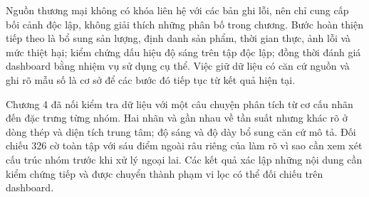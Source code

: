 Nguồn thương mại không có khóa liên hệ với các bản ghi lỗi, nên chỉ cung cấp bối cảnh độc lập, không giải thích những phân bố trong chương. Bước hoàn thiện tiếp theo là bổ sung sản lượng, định danh sản phẩm, thời gian thực, ảnh lỗi và mức thiệt hại; kiểm chứng dấu hiệu độ sáng trên tập độc lập; đồng thời đánh giá dashboard bằng nhiệm vụ sử dụng cụ thể. Việc giữ dữ liệu có căn cứ nguồn và ghi rõ mẫu số là cơ sở để các bước đó tiếp tục từ kết quả hiện tại.

Chương 4 đã nối kiểm tra dữ liệu với một câu chuyện phân tích từ cơ cấu nhãn đến đặc trưng từng nhóm. Hai nhãn  và  gần nhau về tần suất nhưng khác rõ ở dòng thép và diện tích trung tâm; độ sáng và độ dày bổ sung căn cứ mô tả. Đối chiếu 326 cờ toàn tập với sáu điểm ngoài râu riêng của  làm rõ vì sao cần xem xét cấu trúc nhóm trước khi xử lý ngoại lai. Các kết quả xác lập những nội dung cần kiểm chứng tiếp và được chuyển thành phạm vi lọc có thể đối chiếu trên dashboard.
